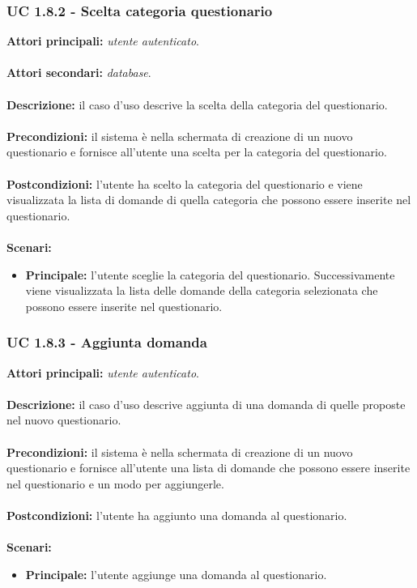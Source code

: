 \documentclass[a4paper,11pt]{article}
\begin{document}
\subsubsection{UC 1.8.2 - Scelta categoria questionario}

\textbf{Attori principali:} \textit{utente autenticato}.\\
\\
\textbf{Attori secondari:} \textit{database}.\\
\\
\textbf{Descrizione:} il caso d'uso descrive la scelta della categoria del questionario. \\
\\
\textbf{Precondizioni:} il sistema è nella schermata di creazione di un nuovo questionario e fornisce all'utente una scelta per la categoria del questionario.\\
\\
\textbf{Postcondizioni:} l'utente ha scelto la categoria del questionario e viene visualizzata la lista di domande di quella categoria che possono essere inserite nel questionario. \\
\\
\textbf{Scenari:}
\begin{itemize}
\item \textbf{Principale:} l'utente sceglie la categoria del questionario. Successivamente viene visualizzata la lista delle domande della categoria selezionata che possono essere inserite nel questionario.
\end{itemize}
\vspace{6 mm}
\subsubsection{UC 1.8.3 - Aggiunta domanda}

\textbf{Attori principali:} \textit{utente autenticato}.\\
\\
\textbf{Descrizione:} il caso d'uso descrive aggiunta di una domanda di quelle proposte nel nuovo questionario. \\
\\
\textbf{Precondizioni:} il sistema è nella schermata di creazione di un nuovo questionario e fornisce all'utente una lista di domande che possono essere inserite nel questionario e un modo per aggiungerle.\\
\\
\textbf{Postcondizioni:} l'utente ha aggiunto una domanda al questionario. \\
\\
\newpage
\textbf{Scenari:}
\begin{itemize}
\item \textbf{Principale:} l'utente aggiunge una domanda al questionario.
\end{itemize}
\vspace{6 mm}
\end{document}
